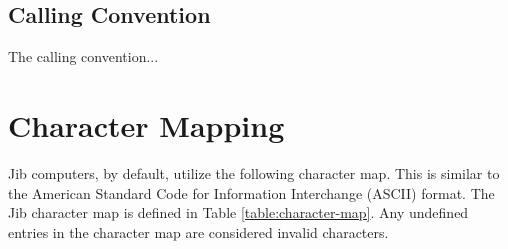 \documentclass{article}
\begin{document}
\subsection{Calling Convention}

The calling convention...

\pagebreak

\section{Character Mapping}
\label{sec:character-map}

Jib computers, by default, utilize the following character map. This is similar to the American Standard Code for Information Interchange (ASCII) format. The Jib character map is defined in Table \ref{table:character-map}. Any undefined entries in the character map are considered invalid characters.

\newcommand{\charmap}[1]{\texttt{#1}}

\newcommand{\charslash}{\texttt{\char`\\}}

\newcommand{\charmapescape}[1]{\charmap{\texttt{\charslash#1}}}
\end{document}
